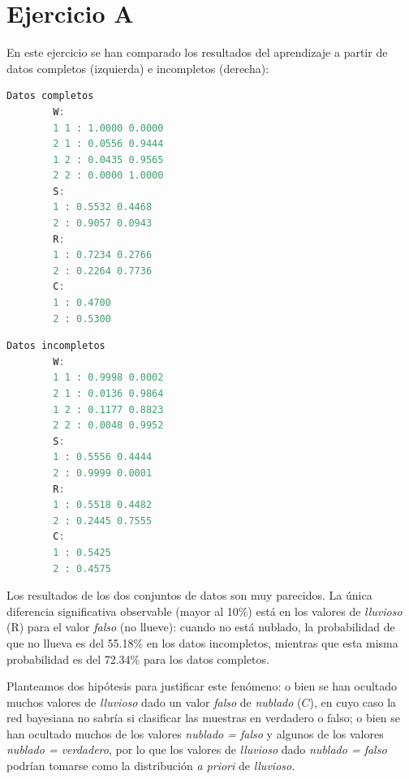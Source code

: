 \documentclass[a4paper]{article}
\begin{document}
\section{Ejercicio A}
\quad En este ejercicio se han comparado los resultados del aprendizaje a partir de datos completos (izquierda) e incompletos (derecha):

    \begin{table}[h!]
      \noindent \begin{minipage}{.45\columnwidth}
        \begin{lstlisting}[language=octave]
		Datos completos
		W:
		1 1 : 1.0000 0.0000 
		2 1 : 0.0556 0.9444 
		1 2 : 0.0435 0.9565 
		2 2 : 0.0000 1.0000 
		S:
		1 : 0.5532 0.4468 
		2 : 0.9057 0.0943 
		R:
		1 : 0.7234 0.2766 
		2 : 0.2264 0.7736 
		C:
		1 : 0.4700 
		2 : 0.5300 
		\end{lstlisting}
      \end{minipage}\hfill
      \begin{minipage}{.6\columnwidth}
      	\begin{lstlisting}[language=octave, xleftmargin=1cm, xrightmargin=1cm]
		Datos incompletos
		W:
		1 1 : 0.9998 0.0002 
		2 1 : 0.0136 0.9864 
		1 2 : 0.1177 0.8823 
		2 2 : 0.0048 0.9952 
		S:
		1 : 0.5556 0.4444 
		2 : 0.9999 0.0001 
		R:
		1 : 0.5518 0.4482 
		2 : 0.2445 0.7555 
		C:
		1 : 0.5425 
		2 : 0.4575 
		\end{lstlisting}
      \end{minipage}
    \end{table}
\begin{center}
\end{center}

\quad Los resultados de los dos conjuntos de datos son muy parecidos. La única diferencia significativa observable (mayor al 10\%) está en los valores de \textit{lluvioso} (R) para el valor \textit{falso} (no llueve): cuando no está nublado, la probabilidad de que no llueva es del 55.18\% en los datos incompletos, mientras que esta misma probabilidad es del 72.34\% para los datos completos.

\quad Planteamos dos hipótesis para justificar este fenómeno: o bien se han ocultado muchos valores de \textit{lluvioso} dado un valor \textit{falso} de \textit{nublado} ($C$), en cuyo caso la red bayesiana no sabría si clasificar las muestras en verdadero o falso; o bien se han ocultado muchos de los valores \textit{nublado = falso} y algunos de los valores \textit{nublado = verdadero}, por lo que los valores de \textit{lluvioso} dado \textit{nublado = falso} podrían tomarse como la distribución \textit{a priori} de \textit{lluvioso}.
\end{document}
